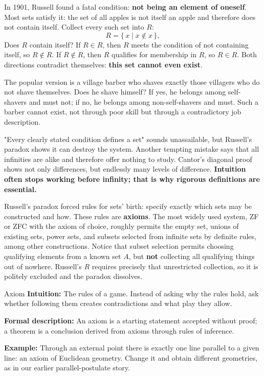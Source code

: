 In 1901, Russell found a fatal condition: \textbf{not being an element of oneself}. Most sets satisfy it: the set of all apples is not itself an apple and therefore does not contain itself. Collect every such set into $R$:
\[
R = \{\, x \mid x \notin x \,\},
\]
Does $R$ contain itself? If $R \in R$, then $R$ meets the condition of not containing itself, so $R \notin R$. If $R \notin R$, then $R$ qualifies for membership in $R$, so $R \in R$. Both directions contradict themselves: \textbf{this set cannot even exist}.

The popular version is a village barber who shaves exactly those villagers who do not shave themselves. Does he shave himself? If yes, he belongs among self-shavers and must not; if no, he belongs among non-self-shavers and must. Such a barber cannot exist, not through poor skill but through a contradictory job description.

\begin{fanli}
"Every clearly stated condition defines a set" sounds unassailable, but Russell's paradox shows it can destroy the system. Another tempting mistake says that all infinities are alike and therefore offer nothing to study. Cantor's diagonal proof shows not only differences, but endlessly many levels of difference. \textbf{Intuition often stops working before infinity; that is why rigorous definitions are essential.}
\end{fanli}

Russell's paradox forced rules for sets' birth: specify exactly which sets may be constructed and how. These rules are \textbf{axioms}. The most widely used system, ZF or ZFC with the axiom of choice, roughly permits the empty set, unions of existing sets, power sets, and subsets selected from infinite sets by definite rules, among other constructions. Notice that subset selection permits choosing qualifying elements from a known set $A$, but \textbf{not} collecting all qualifying things out of nowhere. Russell's $R$ requires precisely that unrestricted collection, so it is politely excluded and the paradox dissolves.

\begin{shuyu}{Axiom}
\textbf{Intuition:} The rules of a game. Instead of asking why the rules hold, ask whether following them creates contradictions and what play they allow.

\textbf{Formal description:} An axiom is a starting statement accepted without proof; a theorem is a conclusion derived from axioms through rules of inference.

\textbf{Example:} Through an external point there is exactly one line parallel to a given line: an axiom of Euclidean geometry. Change it and obtain different geometries, as in our earlier parallel-postulate story.
\end{shuyu}


